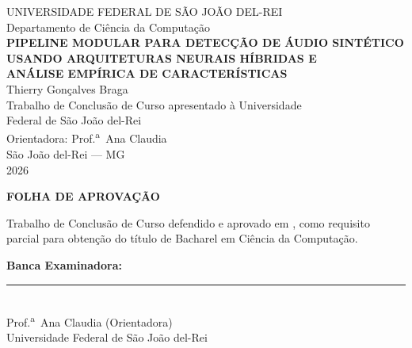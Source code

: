 \documentclass[12pt,a4paper]{article}
\begin{document}
\pagestyle{empty}

\begin{center}
{\large UNIVERSIDADE FEDERAL DE S\~{A}O JO\~{A}O DEL-REI}\\
{\normalsize Departamento de Ci\^{e}ncia da Computa\c{c}\~{a}o}\\[2.0cm]

{\Large\bfseries
PIPELINE MODULAR PARA DETEC\c{C}\~{A}O DE \'{A}UDIO SINT\'{E}TICO\\[0.3cm]
USANDO ARQUITETURAS NEURAIS H\'{I}BRIDAS E\\[0.3cm]
AN\'{A}LISE EMP\'{I}RICA DE CARACTER\'{I}STICAS}\\[2.0cm]

{\large Thierry Gon\c{c}alves Braga}\\[0.5cm]

{\normalsize
Trabalho de Conclus\~{a}o de Curso apresentado \`{a} Universidade\\
Federal de S\~{a}o Jo\~{a}o del-Rei}\\[0.5cm]

{\normalsize Orientadora: Prof.\textsuperscript{a}\ Ana Claudia}\\[3.0cm]

{\normalsize S\~{a}o Jo\~{a}o del-Rei --- MG\\
2026}
\end{center}

\newpage

\begin{center}
\textbf{FOLHA DE APROVA\c{C}\~{A}O}
\end{center}

\vspace{1.5cm}
\noindent
Trabalho de Conclus\~{a}o de Curso defendido e aprovado em \underline{\hspace{4cm}},
como requisito parcial para obten\c{c}\~{a}o do t\'{i}tulo de Bacharel em
Ci\^{e}ncia da Computa\c{c}\~{a}o.

\vspace{2cm}
\noindent\textbf{Banca Examinadora:}

\vspace{1cm}
\noindent\rule{10cm}{0.4pt}\\
Prof.\textsuperscript{a}\ Ana Claudia (Orientadora)\\
Universidade Federal de S\~{a}o Jo\~{a}o del-Rei
\end{document}
